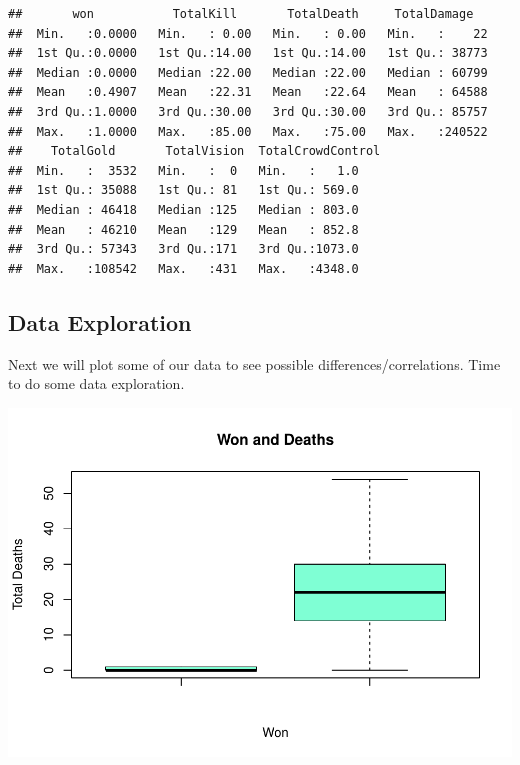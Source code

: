 \documentclass[
]{article}
\newenvironment{Shaded}{\begin{snugshade}}{\end{snugshade}}
\newcommand{\AttributeTok}[1]{\textcolor[rgb]{0.77,0.63,0.00}{#1}}
\newcommand{\ConstantTok}[1]{\textcolor[rgb]{0.00,0.00,0.00}{#1}}
\newcommand{\FunctionTok}[1]{\textcolor[rgb]{0.00,0.00,0.00}{#1}}
\newcommand{\NormalTok}[1]{#1}
\newcommand{\SpecialCharTok}[1]{\textcolor[rgb]{0.00,0.00,0.00}{#1}}
\newcommand{\StringTok}[1]{\textcolor[rgb]{0.31,0.60,0.02}{#1}}
\begin{document}
\begin{verbatim}
##       won           TotalKill       TotalDeath     TotalDamage    
##  Min.   :0.0000   Min.   : 0.00   Min.   : 0.00   Min.   :    22  
##  1st Qu.:0.0000   1st Qu.:14.00   1st Qu.:14.00   1st Qu.: 38773  
##  Median :0.0000   Median :22.00   Median :22.00   Median : 60799  
##  Mean   :0.4907   Mean   :22.31   Mean   :22.64   Mean   : 64588  
##  3rd Qu.:1.0000   3rd Qu.:30.00   3rd Qu.:30.00   3rd Qu.: 85757  
##  Max.   :1.0000   Max.   :85.00   Max.   :75.00   Max.   :240522  
##    TotalGold       TotalVision  TotalCrowdControl
##  Min.   :  3532   Min.   :  0   Min.   :   1.0   
##  1st Qu.: 35088   1st Qu.: 81   1st Qu.: 569.0   
##  Median : 46418   Median :125   Median : 803.0   
##  Mean   : 46210   Mean   :129   Mean   : 852.8   
##  3rd Qu.: 57343   3rd Qu.:171   3rd Qu.:1073.0   
##  Max.   :108542   Max.   :431   Max.   :4348.0
\end{verbatim}

\hypertarget{data-exploration}{%
\subsection{Data Exploration}\label{data-exploration}}

Next we will plot some of our data to see possible
differences/correlations. Time to do some data exploration.

\begin{Shaded}
\end{Shaded}

\includegraphics{Regression_files/figure-latex/unnamed-chunk-5-1.pdf}
\end{document}
